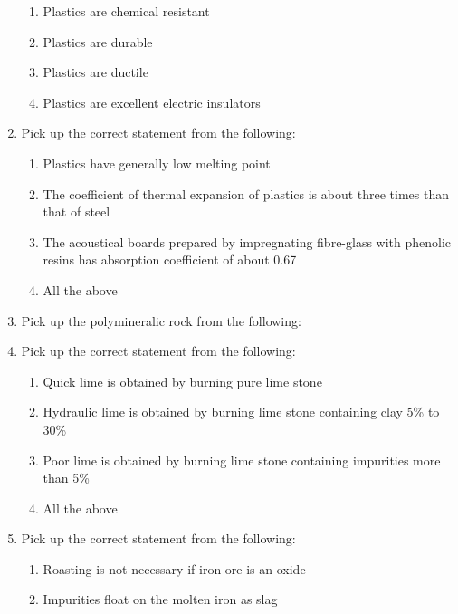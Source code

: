 \documentclass[11pt,a4paper]{article}
\begin{document}
\begin{enumerate}
\begin{enumerate}[label=\Alph*.]
\item{Plastics are chemical resistant}
\item{Plastics are durable}
\item{Plastics are ductile}
\item{Plastics are excellent electric insulators}
\end{enumerate}
\item{Pick up the correct statement from the following:}
\begin{enumerate}[label=\Alph*.]
\item{Plastics have generally low melting point}
\item{The coefficient of thermal expansion of plastics is about three times than that of steel}
\item{The acoustical boards prepared by impregnating fibre-glass with phenolic resins has absorption coefficient of about 0.67}
\item{All the above}
\end{enumerate}
\item{Pick up the polymineralic rock from the following:}
\\
\item{Pick up the correct statement from the following:}
\begin{enumerate}[label=\Alph*.]
\item{Quick lime is obtained by burning pure lime stone}
\item{Hydraulic lime is obtained by burning lime stone containing clay 5\% to 30\%}
\item{Poor lime is obtained by burning lime stone containing impurities more than 5\%}
\item{All the above}
\end{enumerate}
\item{Pick up the correct statement from the following:}
\begin{enumerate}[label=\Alph*.]
\item{Roasting is not necessary if iron ore is an oxide}
\item{Impurities float on the molten iron as slag}

\end{enumerate}
\end{enumerate}
\end{document}
